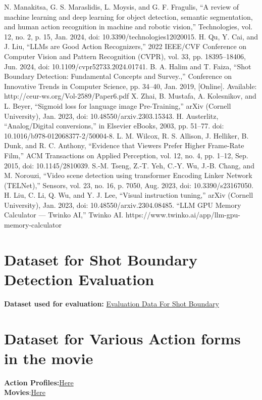 \documentclass[12pt]{report}
\begin{document}
\begin{thebibliography}{99}
		N. Manakitsa, G. S. Maraslidis, L. Moysis, and G. F. Fragulis, “A review of machine learning and deep learning for object detection, semantic segmentation, and human action recognition in machine and robotic vision,” Technologies, vol. 12, no. 2, p. 15, Jan. 2024, doi: 10.3390/technologies12020015.
		H. Qu, Y. Cai, and J. Liu, “LLMs are Good Action Recognizers,” 2022 IEEE/CVF Conference on Computer Vision and Pattern Recognition (CVPR), vol. 33, pp. 18395–18406, Jun. 2024, doi: 10.1109/cvpr52733.2024.01741.
		B. A. Halim and T. Faiza, “Shot Boundary Detection: Fundamental Concepts and Survey.,” Conference on Innovative Trends in Computer Science, pp. 34–40, Jan. 2019, [Online]. Available: http://ceur-ws.org/Vol-2589/Paper6.pdf
		X. Zhai, B. Mustafa, A. Kolesnikov, and L. Beyer, “Sigmoid loss for language image Pre-Training,” arXiv (Cornell University), Jan. 2023, doi: 10.48550/arxiv.2303.15343.
		H. Austerlitz, “Analog/Digital conversions,” in Elsevier eBooks, 2003, pp. 51–77. doi: 10.1016/b978-012068377-2/50004-8.
		 L. M. Wilcox, R. S. Allison, J. Helliker, B. Dunk, and R. C. Anthony, “Evidence that Viewers Prefer Higher Frame-Rate Film,” ACM Transactions on Applied Perception, vol. 12, no. 4, pp. 1–12, Sep. 2015, doi: 10.1145/2810039.
		S.-M. Tseng, Z.-T. Yeh, C.-Y. Wu, J.-B. Chang, and M. Norouzi, “Video scene detection using transformer Encoding Linker Network (TELNet),” Sensors, vol. 23, no. 16, p. 7050, Aug. 2023, doi: 10.3390/s23167050.
		 H. Liu, C. Li, Q. Wu, and Y. J. Lee, “Visual instruction tuning,” arXiv (Cornell University), Jan. 2023, doi: 10.48550/arxiv.2304.08485.
		 “LLM GPU Memory Calculator — Twinko AI,” Twinko AI. https://www.twinko.ai/app/llm-gpu-memory-calculator
	\end{thebibliography}
	
	\newpage
	\appendix
	\renewcommand{\thechapter}{\Alph{chapter}} 
	\chapter{Dataset for Shot Boundary Detection Evaluation} \label{app:sbd_dataset}
	\textbf{Dataset used for evaluation: }\href{https://drive.google.com/file/d/1WiPqupmqC01gvXg4dfgqHFHf6UBJJ1yL/view?usp=drive_link} {Evaluation Data For Shot Boundary}
	\chapter{Dataset for Various Action forms in the movie} \label{app:action_forms_dataset}
	\textbf{Action Profiles:}\href{https://drive.google.com/drive/folders/1APxsIVRthZuePmZua_LhvEbFcj9B0X0M?usp=drive_link}{Here}\\
	\textbf{Movies}:\href{https://drive.google.com/drive/folders/1OoYPjnf8rtZ3b8pJ0KLmMzW3GLqD5o5r?usp=drive_link}{Here}
\end{document}

